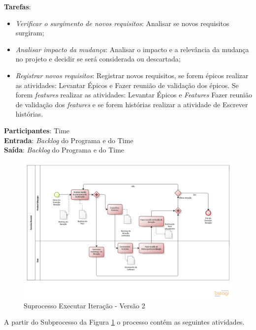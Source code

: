   \textbf{Tarefas}:
  \begin{itemize}
   \item \indent \textit{Verificar o surgimento de novos requisitos}: Analisar se novos requisitos surgiram;

   \item \indent \textit{Analisar impacto da mudança}: Analisar o impacto e a relevância da mudança no projeto e decidir se será considerada
   ou descartada;

   \item \indent \textit{Registrar novos requisitos}: Registrar novos requisitos, se forem épicos realizar as atividades: Levantar Épicos e 
   Fazer reunião de validação dos épicos. Se forem \textit{features} realizar as atividades: Levantar Épicos e \textit{Features}  
   Fazer reunião de validação dos \textit{features} e se forem histórias realizar a atividade de Escrever histórias.
  
  \end{itemize}

  \textbf{Participantes}: Time\\

  \textbf{Entrada}: \textit{Backlog} do Programa e do Time \\

  \textbf{Saída}:  \textit{Backlog} do Programa e do Time \\

\begin{figure}[!htb]
\includegraphics[scale=0.5]{figuras/iteracao2.png}
\caption{Suprocesso Executar Iteração - Versão 2}
\label{fig:iteracao}
\end{figure}

A partir do Subprocesso da Figura \ref{fig:iteracao} o processo contém as seguintes atividades.

